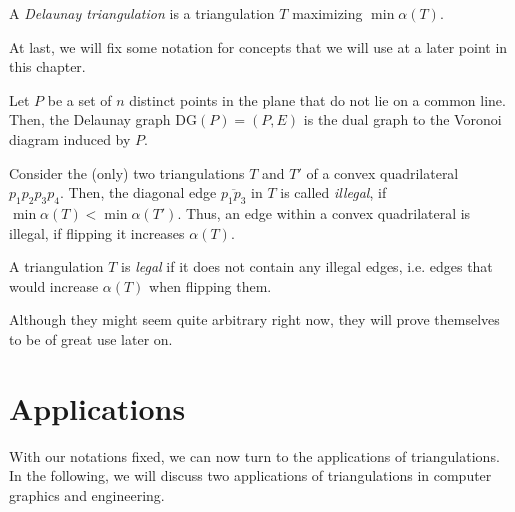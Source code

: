     \begin{definition} 
        A \emph{Delaunay triangulation} is a triangulation $T$ maximizing $\min \alpha(T)$. 
    \end{definition}

    At last, we will fix some notation for concepts that we will use at a later point in this chapter. 

    \begin{definition} 
        Let $P$ be a set of $n$ distinct points in the plane that do not lie on a common line. Then, the Delaunay graph\footnotemark{} $\text{DG}(P) = (P, E)$ is the dual graph to the Voronoi diagram induced by $P$. 
    \end{definition}

    \begin{definition} 
        Consider the (only) two triangulations\footnotemark{} $T$ and $T'$ of a convex quadrilateral $p_1p_2p_3p_4$. Then, the diagonal edge $\overline{p_1p_3}$ in $T$ is called \emph{illegal}, if $\min \alpha(T) < \min \alpha(T')$. Thus, an edge within a convex quadrilateral is illegal, if flipping it increases $\alpha(T)$. 
    \end{definition}

    \begin{definition} 
        A triangulation $T$ is \emph{legal} if it does not contain any illegal edges, i.e. edges that would increase $\alpha(T)$ when flipping them. 
    \end{definition}

    Although they might seem quite arbitrary right now, they will prove themselves to be of great use later on.

\section{Applications}
    With our notations fixed, we can now turn to the applications of triangulations. In the following, we will discuss two applications of triangulations in computer graphics and engineering.

